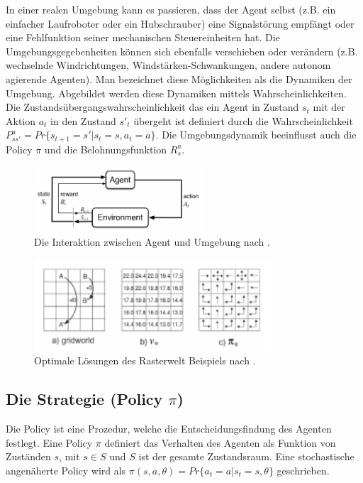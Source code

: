 \documentclass[conference]{IEEEtran}
\begin{document}
In einer realen Umgebung kann es passieren, dass der Agent selbst (z.B. ein einfacher Laufroboter oder ein Hubschrauber) eine Signalstörung empfängt oder eine Fehlfunktion seiner mechanischen Steuereinheiten hat. Die Umgebungsgegebenheiten können sich ebenfalls verschieben oder verändern (z.B. wechselnde Windrichtungen, Windstärken-Schwankungen, andere autonom agierende Agenten). Man bezeichnet diese Möglichkeiten als die Dynamiken der Umgebung. Abgebildet werden diese Dynamiken mittels Wahrscheinlichkeiten. Die Zustandsübergangswahrscheinlichkeit das ein Agent in Zustand $s_t$ mit der Aktion $a_t$ in den Zustand $s'_t$ übergeht ist definiert durch die Wahrscheinlichkeit $P^a_{ss'} = Pr \{ s_{t+1} = s' | s_t = s, a_t = a \}.$ Die Umgebungsdynamik beeinflusst auch die Policy $\pi$ und die Belohnungsfunktion $R^a_s$.

\begin{figure}[!t]
\centering
\includegraphics[width=2.5in]{agent_environment}
\caption{Die Interaktion zwischen Agent und Umgebung nach \cite{sutton_barto_12}.}
\label{agent_environment}
\end{figure}

\begin{figure}[!t]
\centering
\includegraphics[width=3.5in]{gridworld_example}
\caption{Optimale Lösungen des Rasterwelt Beispiels nach \cite{sutton_barto_12}.}
\label{gridworld_example}
\end{figure}

\subsection{Die Strategie (Policy $\pi$)}
Die Policy ist eine Prozedur, welche die Entscheidungsfindung des Agenten festlegt. Eine Policy $\pi$ definiert das Verhalten des Agenten als Funktion von Zuständen $s$, mit $s \in S$ und $S$ ist der gesamte Zustandsraum. Eine stochastische angenäherte Policy wird als $\pi(s,a,\theta) = Pr \{ a_t = a | s_t = s, \theta \}$ geschrieben. 
\end{document}
